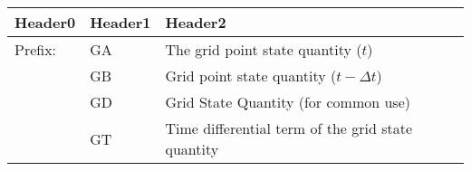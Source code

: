 \begin{longtable}[]{@{}lll@{}}
\toprule
\begin{minipage}[b]{0.30\columnwidth}\raggedright
Header0\strut
\end{minipage} & \begin{minipage}[b]{0.30\columnwidth}\raggedright
Header1\strut
\end{minipage} & \begin{minipage}[b]{0.30\columnwidth}\raggedright
Header2\strut
\end{minipage}\tabularnewline
\midrule
\endhead
\begin{minipage}[t]{0.30\columnwidth}\raggedright
Prefix:\strut
\end{minipage} & \begin{minipage}[t]{0.30\columnwidth}\raggedright
GA\strut
\end{minipage} & \begin{minipage}[t]{0.30\columnwidth}\raggedright
The grid point state quantity (\(t\))\strut
\end{minipage}\tabularnewline
\begin{minipage}[t]{0.30\columnwidth}\raggedright
\strut
\end{minipage} & \begin{minipage}[t]{0.30\columnwidth}\raggedright
GB\strut
\end{minipage} & \begin{minipage}[t]{0.30\columnwidth}\raggedright
Grid point state quantity (\(t-\Delta t\))\strut
\end{minipage}\tabularnewline
\begin{minipage}[t]{0.30\columnwidth}\raggedright
\strut
\end{minipage} & \begin{minipage}[t]{0.30\columnwidth}\raggedright
GD\strut
\end{minipage} & \begin{minipage}[t]{0.30\columnwidth}\raggedright
Grid State Quantity (for common use)\strut
\end{minipage}\tabularnewline
\begin{minipage}[t]{0.30\columnwidth}\raggedright
\strut
\end{minipage} & \begin{minipage}[t]{0.30\columnwidth}\raggedright
GT\strut
\end{minipage} & \begin{minipage}[t]{0.30\columnwidth}\raggedright
Time differential term of the grid state quantity\strut

\end{minipage}
\end{longtable}
